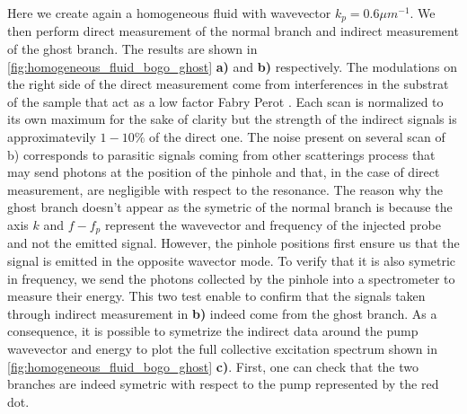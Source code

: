 Here we create again a homogeneous fluid with wavevector $k_p =0.6 \mu m^{-1}$. We then 
perform direct measurement of the normal branch and indirect measurement of the ghost branch. The results are shown in \autoref{fig:homogeneous_fluid_bogo_ghost} \textbf{a)} and \textbf{b)} respectively.  The modulations on the right side of the direct measurement come from interferences in the substrat of the sample
that act as a low factor Fabry Perot \cite{claude_phd}. Each scan is normalized to its own maximum for the sake of clarity but 
the strength of the indirect signals is approximatevily $1-10\%$ of the direct one. The noise present on several scan of b) corresponds to parasitic signals coming from other scatterings process that may send photons at the position of the pinhole and that, in the case of direct measurement, are negligible with respect to the resonance. The reason why the ghost branch doesn't appear as the symetric of the normal branch 
is because the axis $k$ and $f-f_p$ represent the wavevector and frequency of the injected probe and not the emitted signal. However, the pinhole positions first ensure us that the signal is emitted in the opposite wavector mode. To verify that it is also symetric in frequency, we send the photons collected by the pinhole 
into a spectrometer to measure their energy. This two test enable to confirm that the signals taken through indirect measurement in \textbf{b)} indeed come from the ghost branch. As a consequence, it is possible  to symetrize the indirect data around the pump wavevector and energy to plot the full collective excitation spectrum shown in \autoref{fig:homogeneous_fluid_bogo_ghost} \textbf{c)}. First, one can check that the two branches 
are indeed symetric with respect to the pump represented by the red dot.
